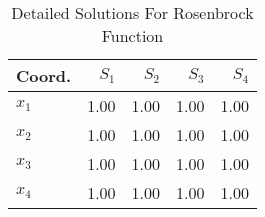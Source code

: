 \begin{table}[H]
\centering
\caption{Detailed Solutions For Rosenbrock Function}
\label{detailedsolutions:rosenbrock4d}
\begin{tabular}{lrrrr}
\toprule
 Coord. &  $S_{1}$ &  $S_{2}$ &  $S_{3}$ &  $S_{4}$ \\
\midrule
$x_{1}$ &     1.00 &     1.00 &     1.00 &     1.00 \\
$x_{2}$ &     1.00 &     1.00 &     1.00 &     1.00 \\
$x_{3}$ &     1.00 &     1.00 &     1.00 &     1.00 \\
$x_{4}$ &     1.00 &     1.00 &     1.00 &     1.00 \\
\bottomrule
\end{tabular}
\end{table}
